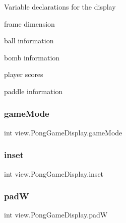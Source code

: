 Variable declarations for the display
\begin{DoxyItemize}
\item frame dimension
\item ball information
\item bomb information
\item player scores
\item paddle information 
\end{DoxyItemize}\hypertarget{classview_1_1_pong_game_display_a38f4635d73ef3c3986ad8a351b6f7a69}{}\label{classview_1_1_pong_game_display_a38f4635d73ef3c3986ad8a351b6f7a69} 
\subsubsection{\texorpdfstring{game\+Mode}{gameMode}}
{\footnotesize\ttfamily int view.\+Pong\+Game\+Display.\+game\+Mode\hspace{0.3cm}{\ttfamily [private]}}

\hypertarget{classview_1_1_pong_game_display_ac202bb5082c22fb3f40ddff2ccc797b5}{}\label{classview_1_1_pong_game_display_ac202bb5082c22fb3f40ddff2ccc797b5} 
\subsubsection{\texorpdfstring{inset}{inset}}
{\footnotesize\ttfamily int view.\+Pong\+Game\+Display.\+inset\hspace{0.3cm}{\ttfamily [private]}}

\hypertarget{classview_1_1_pong_game_display_a9617cc99b5e08dc62ac3272a0934d576}{}\label{classview_1_1_pong_game_display_a9617cc99b5e08dc62ac3272a0934d576} 
\subsubsection{\texorpdfstring{padW}{padW}}
{\footnotesize\ttfamily int view.\+Pong\+Game\+Display.\+padW\hspace{0.3cm}{\ttfamily [private]}}

